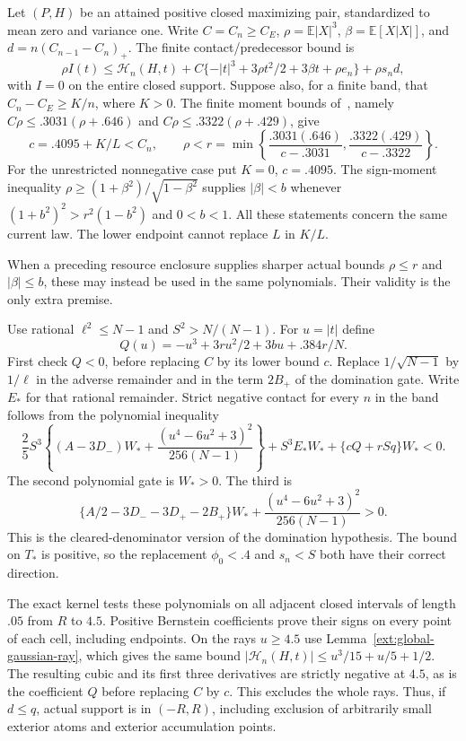 Let $(P,H)$ be an attained positive closed maximizing pair, standardized
to mean zero and variance one. Write $C=C_n\ge C_E$,
$\rho=\mathbb E|X|^3$, $\beta=\mathbb E[X|X|]$, and
$d=n(C_{n-1}-C_n)_+$. The finite contact/predecessor bound is
\[
 \rho I(t)\le\mathcal H_n(H,t)+
 C\{-|t|^3+3\rho t^2/2+3\beta t+\rho e_n\}+\rho s_nd,
\]
with $I=0$ on the entire closed support. Suppose also, for a finite
band, that $C_n-C_E\ge K/n$, where $K>0$. The finite moment bounds of~\cite[p.~125]{Shevtsova2013}, namely
$C\rho\le .3031(\rho+.646)$ and
$C\rho\le .3322(\rho+.429)$, give
\[
 c=.4095+K/L<C_n,\qquad
 \rho<r=\min\left\{\frac{.3031(.646)}{c-.3031},
                        \frac{.3322(.429)}{c-.3322}\right\}.
\]
For the unrestricted nonnegative case put $K=0$, $c=.4095$.
The sign-moment inequality
$\rho\ge(1+\beta^2)/\sqrt{1-\beta^2}$ supplies $|\beta|<b$ whenever
$(1+b^2)^2>r^2(1-b^2)$ and $0<b<1$. All these statements concern the
same current law. The lower endpoint cannot replace $L$ in $K/L$.

When a preceding resource enclosure supplies sharper actual bounds
$\rho\le r$ and $|\beta|\le b$, these may instead be used in the
same polynomials. Their validity is the only extra premise.

Use rational $\ell^2\le N-1$ and $S^2>N/(N-1)$. For $u=|t|$ define
\[
 Q(u)=-u^3+3ru^2/2+3bu+.384r/N.
\]
First check $Q<0$, before replacing $C$ by its lower bound $c$.
Replace $1/\sqrt{N-1}$ by $1/\ell$ in the adverse remainder and in
the term $2B_+$ of the domination gate. Write $E_*$ for that rational
remainder. Strict negative contact for every $n$ in the band follows
from the polynomial inequality
\[
 \frac25S^3\left\{(A-3D_-)W_*+
              \frac{(u^4-6u^2+3)^2}{256(N-1)}\right\}
 +S^3E_*W_*+\{cQ+rSq\}W_*<0.
\]
The second polynomial gate is $W_*>0$. The third is
\[
 \{A/2-3D_--3D_+-2B_+\}W_*+
         \frac{(u^4-6u^2+3)^2}{256(N-1)}>0.
\]
This is the cleared-denominator version of the domination hypothesis.
The bound on $T_*$ is positive, so the replacement $\phi_0<.4$ and
$s_n<S$ both have their correct direction.

The exact kernel tests these polynomials on all adjacent closed intervals
of length $.05$ from $R$ to $4.5$. Positive Bernstein coefficients prove
their signs on every point of each cell, including endpoints. On the
rays $u\ge4.5$ use Lemma~\ref{ext:global-gaussian-ray}, which gives the same bound
$|\mathcal H_n(H,t)|\le u^3/15+u/5+1/2$.
The resulting cubic and its first three derivatives are strictly negative
at $4.5$, as is the coefficient $Q$ before replacing $C$ by $c$.
This excludes the whole rays. Thus, if $d\le q$, actual support is in
$(-R,R)$, including exclusion of arbitrarily small exterior atoms and
exterior accumulation points.


